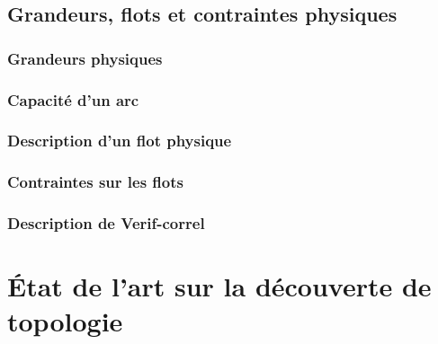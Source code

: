 \documentclass[onecolumn, 12pt]{book}
\begin{document}
		\subsection{Grandeurs, flots et contraintes physiques}
			
			\subsubsection{Grandeurs physiques}
				
			\subsubsection{Capacit\'e d'un arc}
				
			\subsubsection{ Description d'un flot physique}
				
			\subsubsection{ Contraintes sur les flots}
				
			\subsubsection{Description de Verif-correl}
				
%			 	
		
		
	\section{\'Etat de l'art sur la d\'ecouverte de topologie}
		
			

\end{document}
